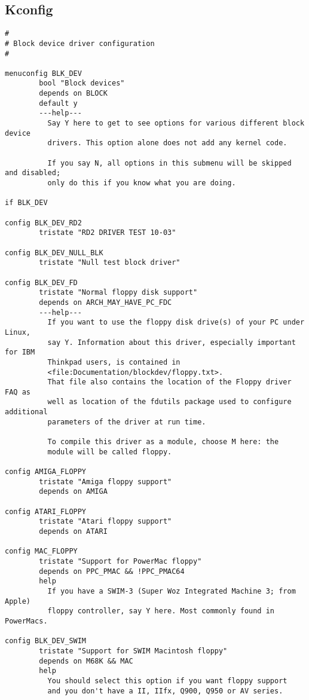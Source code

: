 \documentclass[journal,10pt,onecolumn,compsoc,letterpaper,draftclsnofoot,table,xcdraw]{IEEEtran} \usepackage[margin=0.75in]{geometry}
\begin{document}
\subsection{Kconfig}
\begin{verbatim}
#
# Block device driver configuration
#

menuconfig BLK_DEV
        bool "Block devices"
        depends on BLOCK
        default y
        ---help---
          Say Y here to get to see options for various different block device
          drivers. This option alone does not add any kernel code.

          If you say N, all options in this submenu will be skipped and disabled;
          only do this if you know what you are doing.

if BLK_DEV

config BLK_DEV_RD2
        tristate "RD2 DRIVER TEST 10-03"

config BLK_DEV_NULL_BLK
        tristate "Null test block driver"

config BLK_DEV_FD
        tristate "Normal floppy disk support"
        depends on ARCH_MAY_HAVE_PC_FDC
        ---help---
          If you want to use the floppy disk drive(s) of your PC under Linux,
          say Y. Information about this driver, especially important for IBM
          Thinkpad users, is contained in
          <file:Documentation/blockdev/floppy.txt>.
          That file also contains the location of the Floppy driver FAQ as
          well as location of the fdutils package used to configure additional
          parameters of the driver at run time.

          To compile this driver as a module, choose M here: the
          module will be called floppy.

config AMIGA_FLOPPY
        tristate "Amiga floppy support"
        depends on AMIGA

config ATARI_FLOPPY
        tristate "Atari floppy support"
        depends on ATARI

config MAC_FLOPPY
        tristate "Support for PowerMac floppy"
        depends on PPC_PMAC && !PPC_PMAC64
        help
          If you have a SWIM-3 (Super Woz Integrated Machine 3; from Apple)
          floppy controller, say Y here. Most commonly found in PowerMacs.

config BLK_DEV_SWIM
        tristate "Support for SWIM Macintosh floppy"
        depends on M68K && MAC
        help
          You should select this option if you want floppy support
          and you don't have a II, IIfx, Q900, Q950 or AV series.


\end{verbatim}
\end{document}
